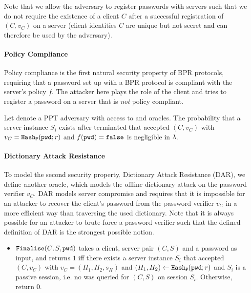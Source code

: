 \noindent
Note that we allow the adversary to register passwords with servers such that we do not require the existence of a client $C$ after a successful registration of $(C,v_C)$ on a server (client identities $C$ are unique but not secret and can therefore be used by the adversary).

\paragraph{Policy Compliance}
Policy compliance is the first natural security property of BPR protocols, requiring that a password set up with a BPR protocol is compliant with the server's policy $f$.
The attacker here plays the role of the client and tries to register a password \pwd on a server that is \emph{not} policy compliant.

\begin{definition}\label{def:pc}
Let \cA denote a PPT adversary with access to \Execute and \Send oracles.
The probability that a server instance $S_i$ exists after \cA terminated that accepted $(C,v_C)$ with $v_C=\mathtt{Hash_P}(\mathtt{pwd};r)$ and $f(\mathtt{pwd})=\mathtt{false}$ is negligible in $\lambda$.
\end{definition}

\paragraph{Dictionary Attack Resistance}
To model the second security property, Dictionary Attack Resistance (DAR), we define another oracle, which models the offline dictionary attack on the password verifier $v_C$.
DAR models server compromise and requires that it is impossible for an attacker to recover the client's password from the password verifier $v_C$ in a more efficient way than traversing the used dictionary.
Note that it is always possible for an attacker to brute-force a password verifier such that the defined definition of DAR is the strongest possible notion.

\begin{itemize}
  \item $\mathtt{Finalise}(C,S,\mathtt{pwd})$ takes a client, server pair $(C,S)$ and a password \pwd as input, and returns $1$ iff there exists a server instance $S_i$ that accepted $(C,v_C)$ with $v_C=(H_1,H_2,s_H)$ and $(H_1,H_2)\gets\mathtt{Hash_P}(\mathtt{pwd};r)$ and $S_i$ is a passive session, i.e. no \Send was queried for $(C,S)$ on session $S_i$.
        Otherwise, return $0$.
\end{itemize}

